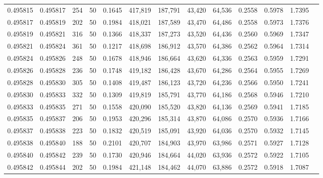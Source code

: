 \begin{tabular}{rrrrrrrrrrrrr}
0.495815 & 0.495817 &   254 &  50 &                                     0.1645 & 417,819 & 187,791 &  43,420 &  64,536 & 0.2558 & 0.5978 & 1.7395 \\
0.495817 & 0.495819 &   202 &  50 &                                     0.1984 & 418,021 & 187,589 &  43,470 &  64,486 & 0.2558 & 0.5973 & 1.7376 \\
0.495819 & 0.495821 &   316 &  50 &                                     0.1366 & 418,337 & 187,273 &  43,520 &  64,436 & 0.2560 & 0.5969 & 1.7347 \\
0.495821 & 0.495824 &   361 &  50 &                                     0.1217 & 418,698 & 186,912 &  43,570 &  64,386 & 0.2562 & 0.5964 & 1.7314 \\
0.495824 & 0.495826 &   248 &  50 &                                     0.1678 & 418,946 & 186,664 &  43,620 &  64,336 & 0.2563 & 0.5959 & 1.7291 \\
0.495826 & 0.495828 &   236 &  50 &                                     0.1748 & 419,182 & 186,428 &  43,670 &  64,286 & 0.2564 & 0.5955 & 1.7269 \\
0.495828 & 0.495830 &   305 &  50 &                                     0.1408 & 419,487 & 186,123 &  43,720 &  64,236 & 0.2566 & 0.5950 & 1.7241 \\
0.495830 & 0.495833 &   332 &  50 &                                     0.1309 & 419,819 & 185,791 &  43,770 &  64,186 & 0.2568 & 0.5946 & 1.7210 \\
0.495833 & 0.495835 &   271 &  50 &                                     0.1558 & 420,090 & 185,520 &  43,820 &  64,136 & 0.2569 & 0.5941 & 1.7185 \\
0.495835 & 0.495837 &   206 &  50 &                                     0.1953 & 420,296 & 185,314 &  43,870 &  64,086 & 0.2570 & 0.5936 & 1.7166 \\
0.495837 & 0.495838 &   223 &  50 &                                     0.1832 & 420,519 & 185,091 &  43,920 &  64,036 & 0.2570 & 0.5932 & 1.7145 \\
0.495838 & 0.495840 &   188 &  50 &                                     0.2101 & 420,707 & 184,903 &  43,970 &  63,986 & 0.2571 & 0.5927 & 1.7128 \\
0.495840 & 0.495842 &   239 &  50 &                                     0.1730 & 420,946 & 184,664 &  44,020 &  63,936 & 0.2572 & 0.5922 & 1.7105 \\
0.495842 & 0.495844 &   202 &  50 &                                     0.1984 & 421,148 & 184,462 &  44,070 &  63,886 & 0.2572 & 0.5918 & 1.7087 \\

\end{tabular}
